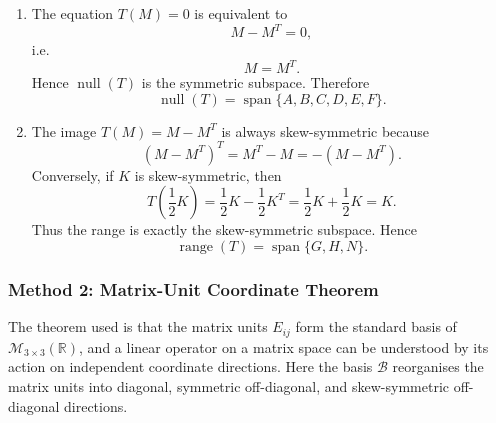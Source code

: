 \documentclass[12pt]{article}
\newcommand{\R}{\mathbb{R}}
\newcommand{\M}{\mathcal{M}}
\newcommand{\B}{\mathcal{B}}
\newcommand{\Null}{\operatorname{null}}
\newcommand{\Range}{\operatorname{range}}
\newcommand{\Span}{\operatorname{span}}
\begin{document}
\begin{enumerate}[label=(\alph*)]
  \item The equation $T(M)=0$ is equivalent to
  \[
  M-M^T=0,
  \]
  i.e.
  \[
  M=M^T.
  \]
  Hence $\Null(T)$ is the symmetric subspace. Therefore
  \[
  \boxed{\Null(T)=\Span\{A,B,C,D,E,F\}.}
  \]

  \item The image $T(M)=M-M^T$ is always skew-symmetric because
  \[
  (M-M^T)^T=M^T-M=-(M-M^T).
  \]
  Conversely, if $K$ is skew-symmetric, then
  \[
  T\left(\frac12K\right)=\frac12K-\frac12K^T=\frac12K+\frac12K=K.
  \]
  Thus the range is exactly the skew-symmetric subspace. Hence
  \[
  \boxed{\Range(T)=\Span\{G,H,N\}.}
  \]
\end{enumerate}

\newpage
\subsubsection{Method 2: Matrix-Unit Coordinate Theorem}
The theorem used is that the matrix units $E_{ij}$ form the standard basis of $\M_{3\times3}(\R)$, and a linear operator on a matrix space can be understood by its action on independent coordinate directions. Here the basis $\B$ reorganises the matrix units into diagonal, symmetric off-diagonal, and skew-symmetric off-diagonal directions.
\end{document}

